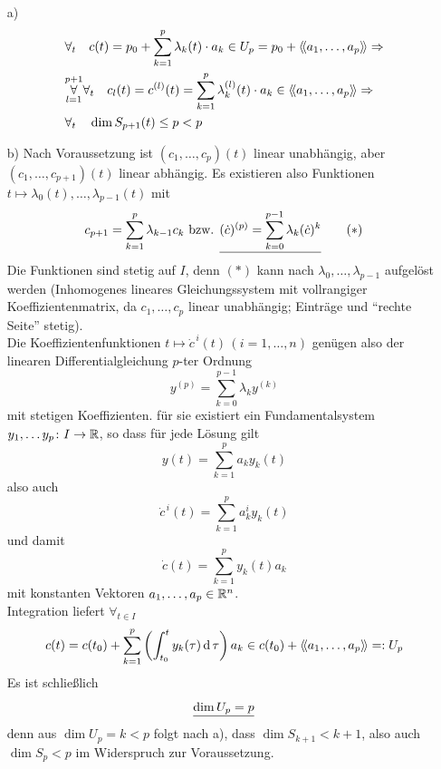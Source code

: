 \begin{beweis} \(\)
 \begin{enumerate}
  \item[a)]
  \begin{align*}
   &\forall_t \quad c(t) = p_0 + \sum_{k=1}^p \lambda_k(t) \cdot a_k \in U_p = p_0 + \left\langle\!\left\langle a_1, \dots, a_p \right\rangle\!\right\rangle \Rightarrow \\
   &\overset{p+1}{\underset{l=1}\forall} \forall_t \quad c_l(t)= c^{(l)}(t) = \sum_{k=1}^p \lambda_k^{(l)}(t)\cdot a_k \in \left\langle\!\left\langle a_1, \dots, a_p \right\rangle\!\right\rangle \Rightarrow \\
   & \forall_t \quad \dim S_{p+1}(t) \le p < p
  \end{align*}
  \item[b)] Nach Voraussetzung ist \((c_1, \dots, c_p)(t) \) linear unabhängig, aber \((c_1, \dots, c_{p+1})(t) \) linear abhängig. Es existieren also Funktionen \(t \mapsto \lambda_0(t), \dots, \lambda_{p-1}(t)\) mit 
  \begin{align*}
   c_{p+1} = \sum_{k=1}^p \lambda_{k-1} c_k \text{ bzw. } \uline{(\dot c)^{(p)} = \sum_{k=0}^{p-1} \lambda_k (\dot c)^k} \tag{\(\ast\)}
  \end{align*}
  Die Funktionen sind stetig auf \(I\), denn \((\ast)\) kann nach \(\lambda_0, \dots, \lambda_{p-1}\) aufgelöst werden (Inhomogenes lineares Gleichungssystem mit vollrangiger Koeffizientenmatrix, da \(c_1, \dots, c_p\) linear unabhängig; Einträge und "`rechte Seite"' stetig). \\
  Die Koeffizientenfunktionen \(t \mapsto \dot c^{\,i}(t) \, (i=1,\dots, n)\) genügen also der linearen Differentialgleichung \(p\)-ter Ordnung
  \[
   y^{(p)} = \sum_{k=0}^{p-1} \lambda_k y^{(k)}
  \]
  mit stetigen Koeffizienten.
  für sie existiert ein Fundamentalsystem \(y_1, \dots y_p \colon I \to \mathbb{R}\), so dass für jede Lösung gilt
  \[
   y(t)=\sum_{k=1}^p a_k y_k(t)
  \]
  also auch
  \[
   \dot c^{\,i}(t)=\sum_{k=1}^p a_k^i y_k(t)
  \]
  und damit
  \[
   \dot c(t)=\sum_{k=1}^p y_k(t) a_k
  \]
  mit konstanten Vektoren \(a_1, \dots, a_p \in \mathbb{R}^n\). \\
  Integration liefert \(\forall_{t \in I}\)
  \[
   c(t)= c(t_0) + \sum_{k=1}^p \left(\int_{t_0}^t y_k(\tau) \operatorname{d} \tau \right) a_k \in c(t_0) + \left\langle\!\left\langle a_1, \dots, a_p \right\rangle\!\right\rangle =: U_p
  \]
  Es ist schließlich 
  \[
  \uline{\dim U_p =p}
  \] 
  denn aus \(\dim U_p = k < p\) folgt nach a), dass \( \dim S_{k+1} < k+1 \), also auch \(\dim S_p <p\) im Widerspruch zur Voraussetzung.
 \end{enumerate}
  
\end{beweis}

